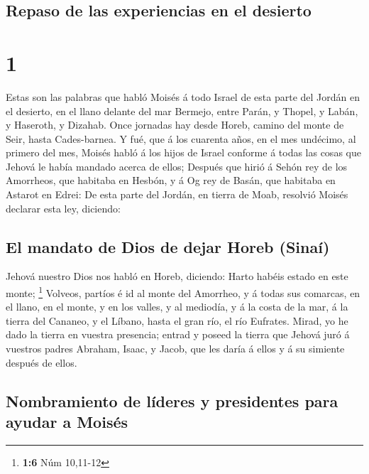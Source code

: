 \hypertarget{repaso-de-las-experiencias-en-el-desierto}{%
\subsection{Repaso de las experiencias en el
desierto}\label{repaso-de-las-experiencias-en-el-desierto}}

\hypertarget{section}{%
\section{1}\label{section}}

 Estas son las palabras que habló Moisés á todo Israel de
esta parte del Jordán en el desierto, en el llano delante del mar
Bermejo, entre Parán, y Thopel, y Labán, y Haseroth, y Dizahab.
 Once jornadas hay desde Horeb, camino del monte de Seir,
hasta Cades-barnea.  Y fué, que á los cuarenta años, en el
mes undécimo, al primero del mes, Moisés habló á los hijos de Israel
conforme á todas las cosas que Jehová le había mandado acerca de ellos;
 Después que hirió á Sehón rey de los Amorrheos, que
habitaba en Hesbón, y á Og rey de Basán, que habitaba en Astarot en
Edrei:  De esta parte del Jordán, en tierra de Moab,
resolvió Moisés declarar esta ley, diciendo:

\hypertarget{el-mandato-de-dios-de-dejar-horeb-sinauxed}{%
\subsection{El mandato de Dios de dejar Horeb
(Sinaí)}\label{el-mandato-de-dios-de-dejar-horeb-sinauxed}}

 Jehová nuestro Dios nos habló en Horeb, diciendo: Harto
habéis estado en este monte; \footnote{\textbf{1:6} Núm 10,11-12}
 Volveos, partíos é id al monte del Amorrheo, y á todas
sus comarcas, en el llano, en el monte, y en los valles, y al mediodía,
y á la costa de la mar, á la tierra del Cananeo, y el Líbano, hasta el
gran río, el río Eufrates.  Mirad, yo he dado la tierra en
vuestra presencia; entrad y poseed la tierra que Jehová juró á vuestros
padres Abraham, Isaac, y Jacob, que les daría á ellos y á su simiente
después de ellos.

\hypertarget{nombramiento-de-luxedderes-y-presidentes-para-ayudar-a-moisuxe9s}{%
\subsection{Nombramiento de líderes y presidentes para ayudar a
Moisés}\label{nombramiento-de-luxedderes-y-presidentes-para-ayudar-a-moisuxe9s}}

